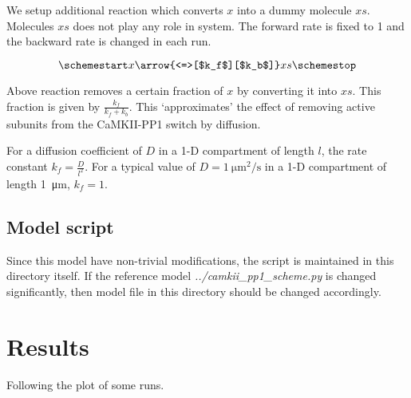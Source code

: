 \documentclass[]{article}
\begin{document}
We setup additional reaction which converts \(x\) into a dummy molecule
\(xs\). Molecules \(xs\) does not play any role in system. The forward
rate is fixed to 1 and the backward rate is changed in each run.

\[\schemestart x \arrow{<=>[$k_f$][$k_b$]} xs \schemestop \label{reac:1} \]

Above reaction removes a certain fraction of \(x\) by converting it into
\(xs\). This fraction is given by \(\frac{k_f}{k_f+k_b}\). This
`approximates' the effect of removing active subunits from the
CaMKII-PP1 switch by diffusion.

For a diffusion coefficient of \(D\) in a 1-D compartment of length
\(l\), the rate constant \(k_f = \frac{D}{l^2}\). For a typical value of
\(D=\SI{1}{\micro \meter^2 \per \second}\) in a 1-D compartment of
length \SI{1}{\micro \meter}, \(k_f = 1\).

\hypertarget{model-script}{%
\subsection{Model script}\label{model-script}}

Since this model have non-trivial modifications, the script is
maintained in this directory itself. If the reference model
\emph{../camkii\_pp1\_scheme.py} is changed significantly, then model
file in this directory should be changed accordingly.

\hypertarget{results}{%
\section{Results}\label{results}}

Following the plot of some runs.
\end{document}
